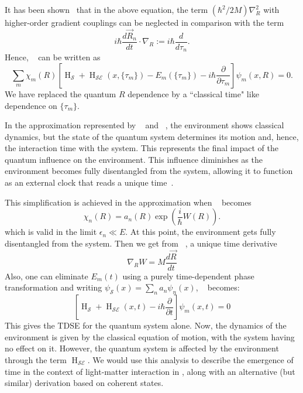 It has been shown~\cite{briggs2001derivation} that in the above equation,
the term \((\hbar^2/2M)\nabla^2 _R\) with higher-order gradient couplings can be neglected in comparison
with the term
\begin{equation*}
i \hbar  \frac{d \vec{R}_n}{dt} \cdot \nabla_{R} := i \hbar \dfrac{d}{d\tau_n}.
\end{equation*}
Hence, ~ can be written as
\begin{equation}
    \label{eqn:chap2_system_evol_mod3}
    \sum_{m} \chi_m(R) \left[
    \operatorname{H}_{\mathcal{S}} + \operatorname{H}_{\mathcal{SE}}(x,
   \{ \tau_m\})  - E_m(\{\tau_m\})  - i \hbar \dfrac{\partial }{\partial \tau_m} \right] 
    \psi_m (x, R)= 0.
\end{equation}
We have replaced the quantum \(R\) dependence by a ``classical time" like dependence on \(\{\tau_m\}\).

In the approximation represented by ~ and
~, the environment shows classical dynamics, but
the state of the quantum system determines its motion and, hence, the interaction time with the system. This represents the final impact of the quantum influence on the environment. This influence diminishes as the environment becomes fully disentangled
from the system, allowing it to function as an external clock that reads a unique time~\cite{briggs2001derivation}.

This simplification is achieved in the approximation when ~ becomes
\begin{equation}
    \label{eqn:chap2_clc_action2}
    \chi_n(R) = a_n(R) \exp\left(\frac{i}{\hbar} W(R)\right).
\end{equation}
which is valid in the limit \(\epsilon_n \ll E\). At this point, the environment gets fully disentangled from the system. Then we get from ~, a unique time derivative
\begin{equation}
    \label{eqn:chap2_clc_action3}
    \nabla_R W = M \dfrac{d \vec{R}}{dt}
\end{equation}
Also, one can eliminate \(E_m(t)\) using a purely time-dependent phase transformation and writing 
\(\psi_{\mathcal{S}}(x) = \sum_{n}a_n \psi_n(x)\), ~ becomes:
\begin{equation}
    \label{eqn:chap2_system_evol_mod4}
     \left[
    \operatorname{H}_{\mathcal{S}} + \operatorname{H}_{\mathcal{SE}}(x, t)- i \hbar \dfrac{\partial}{\partial t} \right] 
    \psi_m (x,t)= 0
\end{equation}
This gives the TDSE for the quantum system alone. Now, the dynamics of the environment is given by the classical equation of motion, with the system having no effect on it. However, the quantum system is affected by the environment through the term \(\operatorname{H}_{\mathcal{SE}}\). We would use this analysis to describe the emergence of time in the context of light-matter interaction in , 
along with an alternative (but similar) derivation based on coherent states. 